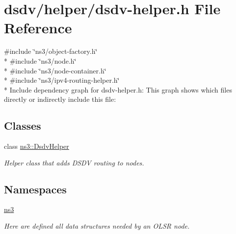 \hypertarget{dsdv-helper_8h}{}\section{dsdv/helper/dsdv-\/helper.h File Reference}
\label{dsdv-helper_8h}
{\ttfamily \#include \char`\"{}ns3/object-\/factory.\+h\char`\"{}}\\*
{\ttfamily \#include \char`\"{}ns3/node.\+h\char`\"{}}\\*
{\ttfamily \#include \char`\"{}ns3/node-\/container.\+h\char`\"{}}\\*
{\ttfamily \#include \char`\"{}ns3/ipv4-\/routing-\/helper.\+h\char`\"{}}\\*
Include dependency graph for dsdv-\/helper.h\+:
This graph shows which files directly or indirectly include this file\+:
\subsection*{Classes}
\begin{DoxyCompactItemize}
\item 
class \hyperlink{classns3_1_1DsdvHelper}{ns3\+::\+Dsdv\+Helper}
\begin{DoxyCompactList}\small\item\em Helper class that adds D\+S\+DV routing to nodes. \end{DoxyCompactList}\end{DoxyCompactItemize}
\subsection*{Namespaces}
\begin{DoxyCompactItemize}
\item 
 \hyperlink{namespacens3}{ns3}
\begin{DoxyCompactList}\small\item\em Here are defined all data structures needed by an O\+L\+SR node. \end{DoxyCompactList}\end{DoxyCompactItemize}
